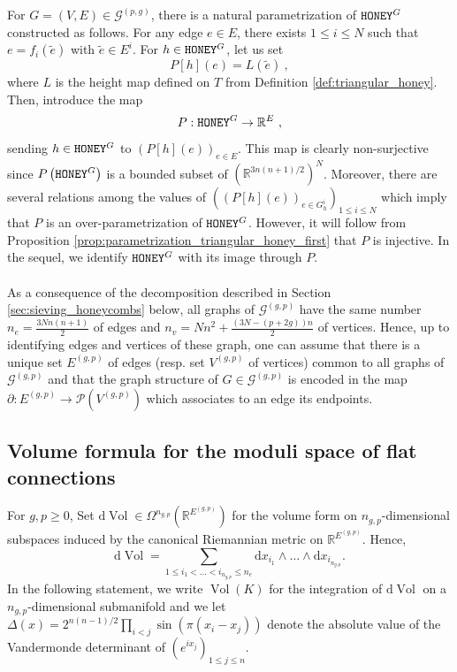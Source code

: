 \documentclass[11pt,a4paper]{amsart}
\providecommand{\diff}{\mathrm d}
\providecommand{\Vol}{\operatorname{Vol}}
\providecommand{\honey}{\texttt{\textsc{HONEY}}}
\numberwithin{equation}{section}
\theoremstyle{definition}
\begin{document}
\noindent
For $G = (V, E) \in\mathcal{G}^{(p, g)}$, there is a natural parametrization of 
$\honey^G$ constructed as follows. For any edge $e\in E$, there exists $1\leqslant i\leqslant N$ such that 
$e=f_i(\tilde{e})$ with $\tilde{e}\in E^i$. For $h\in\honey^G$, let us set 
$$P[h](e)=L(\tilde{e}) \ ,$$ 
where $L$ is the height map defined on $T$ from 
Definition \ref{def:triangular_honey}. 
Then, introduce the map
\begin{equation}
    \label{eq:parametrization_P}
    P: \honey^{G}\rightarrow \mathbb{R}^{E} \ ,
\end{equation}
sending $h\in \honey^{G}$ to $(P[h](e))_{e\in E}$. 
This map is clearly non-surjective 
since $P \left(\honey^G\right)$ is a bounded subset of 
$\left(\mathbb{R}^{3n(n+1)/2}\right)^N$. 
Moreover, there are several relations among the 
values of $((P[h](e))_{e\in G_h^i})_{1\leqslant i\leqslant N}$
which imply that $P$ is an over-parametrization of $\honey^{G}$. 
However, it will follow from 
Proposition \ref{prop:parametrization_triangular_honey_first} that $P$ is injective. 
In the sequel, we identify $\honey^G$ with its image through $P$. 
\\
\\
As a consequence of the decomposition described in Section \ref{sec:sieving_honeycombs} below, 
all graphs of $\mathcal{G}^{(g,p)}$ have the same number $n_{e} = \frac{3Nn(n+1)}{2}$ 
of edges and $n_{v} = Nn^2+\frac{(3N - (p+2g))n}{2} $ of vertices. 
Hence, up to identifying edges and vertices of these graph, one can assume that there 
is a unique set $E^{(g,p)}$ of edges (resp. set $V^{(g,p)}$ of vertices) 
common to all graphs of $\mathcal{G}^{(g,p)}$ and that the graph structure of 
$G\in \mathcal{G}^{(g,p)}$ is encoded in the map $\partial:E^{(g,p)}\rightarrow 
\mathcal{P}(V^{(g,p)})$ which associates to an edge its endpoints.

\subsection{Volume formula for the moduli space of flat connections}

For $g,p\geqslant 0$, Set $\diff \Vol\in\Omega^{n_{g,p}}\left(\mathbb{R}^{E^{(g,p)}}\right)$ 
for the volume form on $n_{g,p}$-dimensional subspaces induced by the 
canonical Riemannian metric on $\mathbb{R}^{E^{(g,p)}}$. Hence, 
\begin{equation}
    \label{eq:volume_R_E}
    \diff \Vol = \sum_{1\leqslant i_1<\ldots<i_{n_{g,p}} \leqslant n_{e}}\diff x_{i_1} 
    \wedge\ldots \wedge \diff x_{i_{n_{g,p}}}.
\end{equation}
In the following statement, we write $\Vol(K)$ for the integration of $ \diff \Vol$ on a 
$n_{g,p}$-dimensional submanifold and we let $\Delta(x)=2^{n(n-1)/2}\prod_{i<j}\sin(\pi(x_i-x_j))$ 
denote the absolute value of the Vandermonde determinant of $(e^{ix_j})_{1\leqslant j\leqslant n}$.
\end{document}
